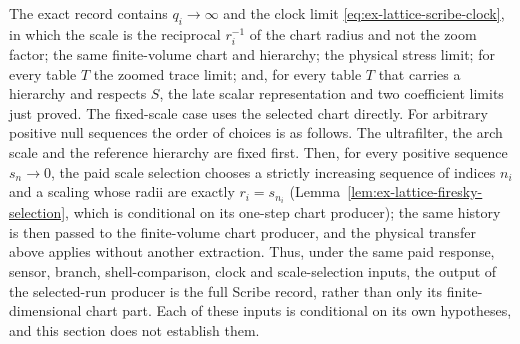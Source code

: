 The exact record contains $q_i\to\infty$ and the clock limit
\eqref{eq:ex-lattice-scribe-clock}, in which the scale is the reciprocal
$r_i^{-1}$ of the chart radius and not the zoom factor;
the same finite-volume
chart and hierarchy; the physical stress limit; for every table $T$ the
zoomed trace limit; and, for every table $T$ that carries a hierarchy and
respects $S$, the late scalar representation and two coefficient limits
just proved. The fixed-scale case uses the selected
chart directly. For arbitrary positive null sequences the order of choices
is as follows. The ultrafilter, the arch scale and the reference hierarchy
are fixed first. Then, for every positive sequence $s_n\to0$, the paid
scale selection chooses a strictly increasing sequence of indices $n_i$
and a scaling whose radii are exactly $r_i=s_{n_i}$
(Lemma~\ref{lem:ex-lattice-firesky-selection}, which is conditional on
its one-step chart producer); the same history is then passed to the
finite-volume chart producer, and the physical transfer above applies
without another extraction. Thus, under the same paid response, sensor,
branch, shell-comparison, clock and scale-selection inputs, the output of
the selected-run producer is the full Scribe record, rather than only its
finite-dimensional chart part. Each of these inputs is conditional on
its own hypotheses, and this section does not establish them.
